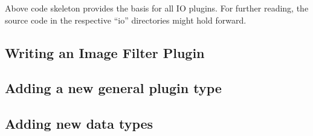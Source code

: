 \noindent 
Above code skeleton provides the basis for all IO plugins. 
For further reading, the source code in the respective ``io'' directories might hold forward. 

\subsection{Writing an Image Filter Plugin}
\label{ch:filterplugin}

\subsection{Adding a new general plugin type}
\label{ch:addpluginstype}

\subsection{Adding new data types}
\label{sec:adddatatypeio}



\cleardoublepage{}

